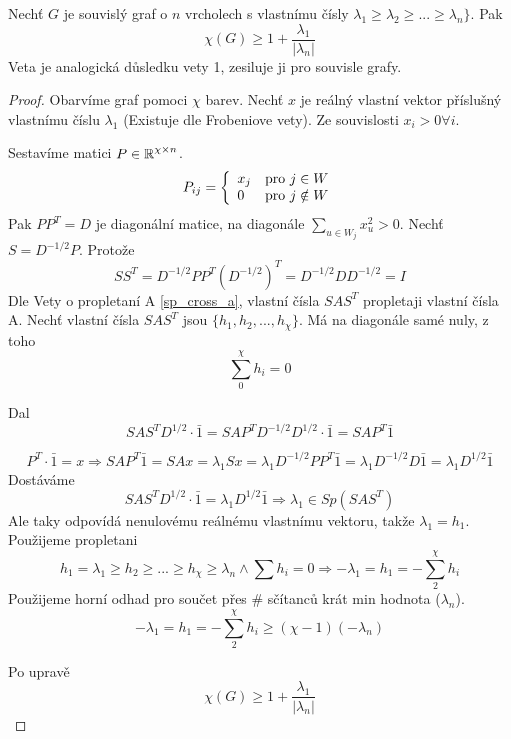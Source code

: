 \begin{theorem}
	Nechť $G$ je souvislý graf o $n$ vrcholech s vlastnímu čísly $\lambda_1 \geq \lambda_2 \geq ... \geq \lambda_n \}$. Pak
	\[ \chi(G) \geq 1 + \frac{\lambda_1}{|\lambda_n|} \]
	Veta je analogická důsledku vety 1, zesiluje ji pro souvisle grafy.
\end{theorem}
\begin{proof}
	Obarvíme graf pomoci $\chi$ barev. Nechť $x$ je reálný vlastní vektor příslušný vlastnímu číslu $\lambda_1$ (Existuje dle Frobeniove vety).
	Ze souvislosti $x_i > 0 \forall i$.

	Sestavíme matici $P \in \operatorname{\mathbb{R}}^{\chi \times n}$.
	\[ P_{ij} = \left\{ \begin{array}{ll}  x_j & \mbox{pro } j \in W \\ 0 & \mbox{pro } j \notin W \end{array} \right. \]
	Pak $PP^T = D$ je diagonální matice, na diagonále $\sum_{u \in W_j}x_u^2 > 0$.
	Nechť $S = D^{-1/2}P$.
	Protože
	\[SS^T = D^{-1/2}PP^T(D^{-1/2})^T = D^{-1/2}DD^{-1/2} = I\]
	Dle Vety o propletaní A \cref{sp_cross_a}, vlastní čísla $SAS^T$ propletaji vlastní čísla A.
	Nechť vlastní čísla $SAS^T$ jsou $\{h_1, h_2,..., h_{\chi} \}$. Má na diagonále samé nuly, z toho %
	\[ \sum_0^{\chi} h_i = 0 \]

	Dal
	\[ SAS^{T}D^{1/2} \cdot \bar{1} = SAP^TD^{-1/2}D^{1/2} \cdot \bar{1} = SAP^T \bar{1} \]

	\[ P^T \cdot \bar{1} = x \Rightarrow SAP^T \bar{1} = SAx = \lambda_1 Sx = \lambda_1 D^{-1/2}PP^T \bar{1} = \lambda_1 D^{-1/2}D \bar{1} = \lambda_1 D^{1/2} \bar{1} \]
	Dostáváme
	\[ SAS^TD^{1/2} \cdot \bar{1} = \lambda_1 D^{1/2} \bar{1} \Rightarrow \lambda_1 \in Sp(SAS^T) \]
	Ale taky odpovídá nenulovému reálnému vlastnímu vektoru, takže $\lambda_1 = h_1$.
	Použijeme propletani
	\[ h_1 = \lambda_1 \geq h_2 \geq ... \geq h_{\chi} \geq \lambda_n \land \sum h_i = 0 \Rightarrow -\lambda_1 = h_1 = -\sum_2^{\chi} h_i \]
	Použijeme horní odhad pro součet přes \# sčítanců krát min hodnota ($\lambda_n$).
	\[ -\lambda_1 = h_1 = -\sum_2^{\chi} h_i \geq (\chi - 1)(-\lambda_n) \]

	Po upravě
	\[ \chi(G) \geq 1 + \frac{\lambda_1}{|\lambda_n|} \]
\end{proof}
